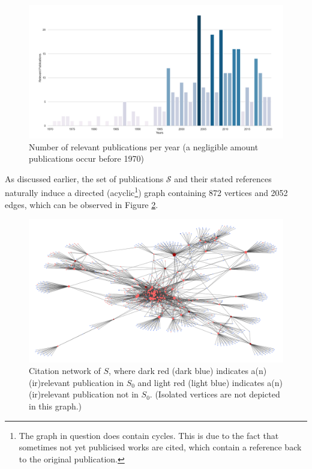 \documentclass[11pt,a4paper]{book}
\theoremstyle{definition}
\theoremstyle{definition}
\theoremstyle{definition}
\theoremstyle{remark}
\newcommand{\tpset}{\mathcal{S}}
\newcommand{\pset}{S}
\newcommand{\psetz}{S_{\mathit{0}}}
\begin{document}
\begin{figure}[h]
\includegraphics[width=\textwidth]{relevant_publications_per_year.png}
\caption{Number of relevant publications per year (a negligible amount publications occur before 1970)}
\label{fig:pgraph-relevant_publications_per_year}
\end{figure}

As discussed earlier, the set of publications $\tpset$ and their stated references naturally induce a directed (acyclic\footnote{The graph in question does contain cycles. This is due to the fact that sometimes not yet publicised works are cited, which contain a reference back to the original publication.}) graph containing 872 vertices and 2052 edges, which can be observed in Figure \ref{fig:pgraph-whole_graph}.


\begin{figure}[h]
\includegraphics[width=\textwidth]{whole_graph.png}
\caption{Citation network of $\pset$, where \textcolor{start_relevant}{dark red}  (\textcolor{start_nrelevant}{dark blue}) indicates a(n) (ir)relevant publication in $\psetz$ and \textcolor{other_relevant}{light red}  (\textcolor{other_nrelevant}{light blue}) indicates a(n) (ir)relevant publication not in $\psetz$. (Isolated vertices are not depicted in this graph.)}
\label{fig:pgraph-whole_graph}
\end{figure}
\end{document}
